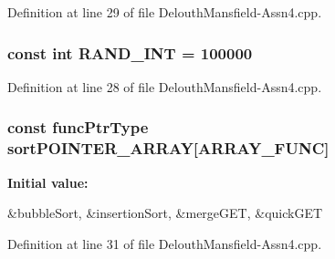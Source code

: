 Definition at line 29 of file DelouthMansfield-\/Assn4.cpp.

\hypertarget{_delouth_mansfield-_assn4_8cpp_a134c2ba56ae9ba89c77a5c0dba9f2124}{
\subsubsection[{RAND\_\-INT}]{\setlength{\rightskip}{0pt plus 5cm}const int {\bf RAND\_\-INT} = 100000}}
\label{_delouth_mansfield-_assn4_8cpp_a134c2ba56ae9ba89c77a5c0dba9f2124}


Definition at line 28 of file DelouthMansfield-\/Assn4.cpp.

\hypertarget{_delouth_mansfield-_assn4_8cpp_ae039780346621e190c7726c08c9a1a13}{
\subsubsection[{sortPOINTER\_\-ARRAY}]{\setlength{\rightskip}{0pt plus 5cm}const {\bf funcPtrType} {\bf sortPOINTER\_\-ARRAY}\mbox{[}{\bf ARRAY\_\-FUNC}\mbox{]}}}
\label{_delouth_mansfield-_assn4_8cpp_ae039780346621e190c7726c08c9a1a13}
{\bfseries Initial value:}
\begin{DoxyCode}
 {&bubbleSort,
                                          &insertionSort,
                                          &mergeGET,
                                                   &quickGET}
\end{DoxyCode}


Definition at line 31 of file DelouthMansfield-\/Assn4.cpp.

